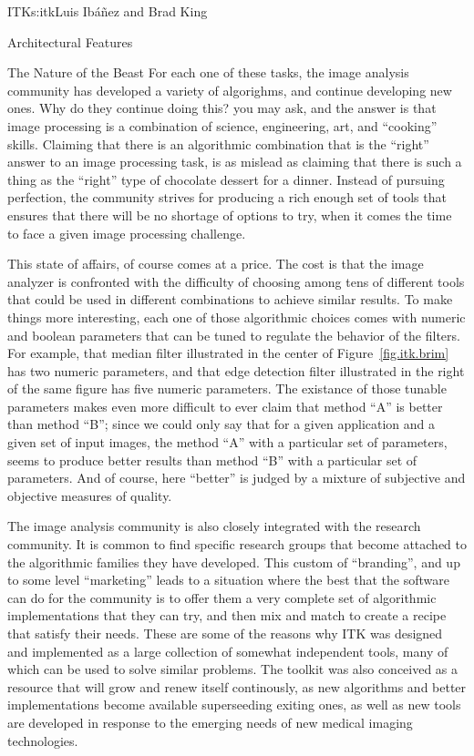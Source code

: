 \begin{aosachapter}{ITK}{s:itk}{Luis Ib\'{a}\~{n}ez and Brad King}
\begin{aosasect1}{Architectural Features}
\begin{aosasect2}{The Nature of the Beast}
For each one of these tasks, the image analysis community has developed a
variety of algorighms, and continue developing new ones. Why do they continue
doing this? you may ask, and the answer is that image processing is a
combination of science, engineering, art, and ``cooking'' skills. Claiming that
there is an algorithmic combination that is the ``right'' answer to an image
processing task, is as mislead as claiming that there is such a thing as the
``right'' type of chocolate dessert for a dinner. Instead of pursuing
perfection, the community strives for producing a rich enough set of tools that
ensures that there will be no shortage of options to try, when it comes the
time to face a given image processing challenge.

This state of affairs, of course comes at a price. The cost is that the image
analyzer is confronted with the difficulty of choosing among tens of different
tools that could be used in different combinations to achieve similar results.
To make things more interesting, each one of those algorithmic choices comes
with numeric and boolean parameters that can be tuned to regulate the behavior
of the filters. For example, that median filter illustrated in the center of
Figure~\ref{fig.itk.brim} has two numeric parameters, and that edge detection
filter illustrated in the right of the same figure has five numeric parameters.
The existance of those tunable parameters makes even more difficult to ever
claim that method ``A'' is better than method ``B''; since we could only say
that for a given application and a given set of input images, the method ``A''
with a particular set of parameters, seems to produce better results than
method ``B'' with a particular set of parameters.  And of course, here
``better'' is judged by a mixture of subjective and objective measures of
quality.

The image analysis community is also closely integrated with the research
community. It is common to find specific research groups that become attached
to the algorithmic families they have developed. This custom of ``branding'',
and up to some level ``marketing'' leads to a situation where the best that the
software can do for the community is to offer them a very complete set of
algorithmic implementations that they can try, and then mix and match to create
a recipe that satisfy their needs. These are some of the reasons why ITK was
designed and implemented as a large collection of somewhat independent tools,
many of which can be used to solve similar problems. The toolkit was also
conceived as a resource that will grow and renew itself continously, as new
algorithms and better implementations become available superseeding exiting
ones, as well as new tools are developed in response to the emerging needs of
new medical imaging technologies.


\end{aosasect2}
\end{aosasect1}
\end{aosachapter}
